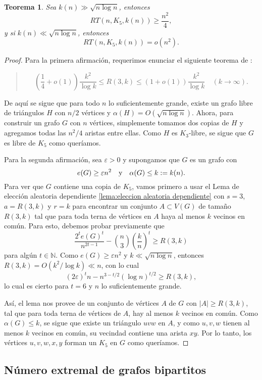 \documentclass[12pt]{report}
\theoremstyle{plain}
\newtheorem{theorem}{Teorema}[section]
\theoremstyle{definition}
\newcommand{\naturals}{\mathbb{N}}
\newcommand{\abs}[1]{\left \vert #1 \right \vert}
\begin{document}
\begin{theorem}
Sea $k(n) \gg \sqrt{n \log n}$, entonces
\[
    RT (n, K_5, k(n)) \geq \frac{n^2}{4},
\]
y si $k(n) \ll \sqrt{n \log n}$, entonces
\[
    RT (n, K_5 , k(n)) = o (n^2).
\]
\end{theorem}
\begin{proof}
Para la primera afirmación, requerimos enunciar el siguiente teorema de \cite[Teorema 9.2.8]{botler2022combinatoria}:
\begin{quote}
\[
    \left ( \frac 1 4 + o (1 ) \right ) \frac{k^2}{\log k} \leq R(3, k) \leq (1 + o (1)) \frac{k^2}{\log k} \quad (k \to \infty).
\]
\end{quote}
De aquí se sigue que para todo $n$ lo suficientemente grande, existe un grafo libre de triángulos $H$ con $n/2$ vértices y $\alpha (H) = O (\sqrt{n \log n})$. Ahora, para construir un grafo $G$ con $n$ vértices, simplemente tomamos dos copias de $H$ y agregamos todas las $n^2/4$ aristas entre ellas. Como $H$ es $K_3$-libre, se sigue que $G$ es libre de $K_5$ como queríamos.

Para la segunda afirmación, sea $\varepsilon > 0$ y supongamos que $G$ es un grafo con
\[
e(G) \geq \varepsilon n^2 \quad \text y \quad \alpha (G) \leq k := k(n).
\]
Para ver que $G$ contiene una copia de $K_5$, vamos primero a usar el Lema de elección aleatoria dependiente \ref{lema:eleccion aleatoria dependiente} con $s = 3$, $a = R(3,k)$ y $r = k$ para encontrar un conjunto $A \subset V(G)$ de tamaño $R(3,k)$ tal que para toda terna de vértices en $A$ haya al menos $k$ vecinos en común. Para esto, debemos probar previamente que
\[
\frac{2^t e(G)^t}{n^{2t - 1}} - \binom n 3 \left ( \frac k n \right )^t \geq R(3, k)
\]
para algún $t \in \naturals$. Como $e(G) \geq \varepsilon n^2$ y $k \ll \sqrt{n \log n}$, entonces $R(3,k) = O (k^2 / \log k) \ll n$, con lo cual
\[
    (2 \varepsilon)^t n - n^{3- t/2} (\log n)^{t/2} \geq R(3, k),
\]
lo cual es cierto para $t = 6$ y $n$ lo suficientemente grande.

Así, el lema nos provee de un conjunto de vértices $A$ de $G$ con $\abs A \geq R(3,k)$, tal que para toda terna de vértices de $A$, hay al menos $k$ vecinos en común. Como $\alpha (G) \leq k$, se sigue que existe un triángulo $uvw$ en $A$, y como $u,v,w$ tienen al menos $k$ vecinos en común, su vecindad contiene una arista $xy$. Por lo tanto, los vértices $u,v,w,x,y$ forman un $K_5$ en $G$ como queríamos.
\end{proof}

\subsection{Número extremal de grafos bipartitos}
\end{document}

